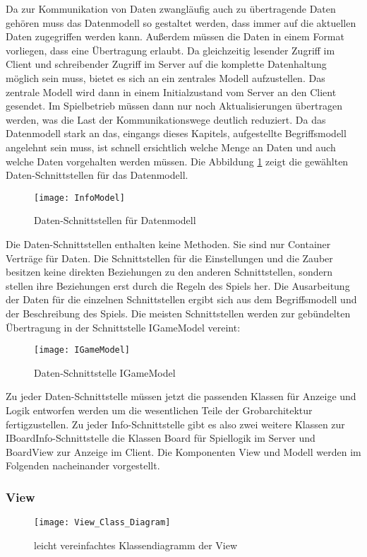 \noindent Da zur Kommunikation von Daten zwangläufig auch zu übertragende Daten gehören muss das Datenmodell so gestaltet werden, dass immer auf die aktuellen Daten zugegriffen werden kann. Außerdem müssen die Daten in einem Format vorliegen, dass eine Übertragung erlaubt. Da gleichzeitig lesender Zugriff im Client und schreibender Zugriff im Server auf die komplette Datenhaltung möglich sein muss, bietet es sich an ein zentrales Modell aufzustellen. Das zentrale Modell wird dann in einem Initialzustand vom Server an den Client gesendet. Im Spielbetrieb müssen dann nur noch Aktualisierungen übertragen werden, was die Last der Kommunikationswege deutlich reduziert. Da das Datenmodell stark an das, eingangs dieses Kapitels, aufgestellte Begriffsmodell angelehnt sein muss, ist schnell ersichtlich welche Menge an Daten und auch welche Daten vorgehalten werden müssen.
Die Abbildung \ref{fig:InfoModel} zeigt die gewählten Daten-Schnittstellen für das Datenmodell. 
\begin{figure}[htp]
	\centering
	\captionsetup{justification=centering}
	\texttt{[image: InfoModel]}
	\caption[InfoModel]{Daten-Schnittstellen für Datenmodell}
	\label{fig:InfoModel}
\end{figure}
\clearpage
\noindent Die Daten-Schnittstellen enthalten keine Methoden. Sie sind nur Container \bzw Verträge für Daten. Die Schnittstellen für die Einstellungen und die Zauber besitzen keine direkten Beziehungen zu den anderen Schnittstellen, sondern stellen ihre Beziehungen erst durch die Regeln des Spiels her. Die Ausarbeitung der Daten für die einzelnen Schnittstellen ergibt sich aus dem Begriffsmodell und der Beschreibung des Spiels. Die meisten Schnittstellen werden zur gebündelten Übertragung in der Schnittstelle IGameModel vereint:


\begin{figure}[htp]
	\centering
	\captionsetup{justification=centering}
	\texttt{[image: IGameModel]}
	\caption[IGameModel]{Daten-Schnittstelle IGameModel}
	\label{fig:IGameModel}
\end{figure}
\noindent Zu jeder Daten-Schnittstelle müssen jetzt die passenden Klassen für Anzeige und Logik entworfen werden um die wesentlichen Teile der Grobarchitektur fertigzustellen. Zu jeder Info-Schnittstelle gibt es also zwei weitere Klassen \zB zur IBoardInfo-Schnittstelle die Klassen Board für Spiellogik im Server und BoardView zur Anzeige im Client. Die Komponenten View und Modell werden im Folgenden nacheinander vorgestellt.
\clearpage
\subsubsection{View}
\begin{figure}[htp]
	\centering
	\captionsetup{justification=centering}
	\texttt{[image: View\_Class\_Diagram]}
	\caption[View]{leicht vereinfachtes Klassendiagramm der View}
	\label{fig:ClassesView}
\end{figure}

